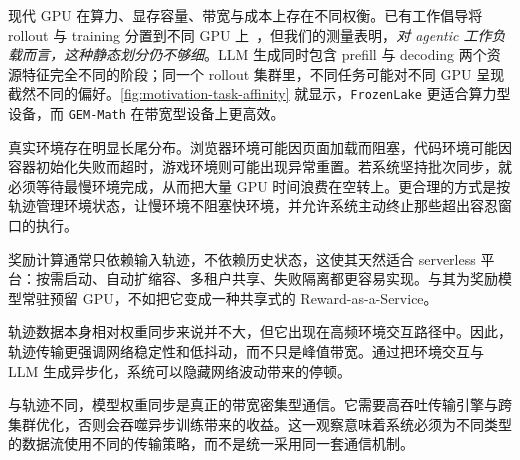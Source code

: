 现代 GPU 在算力、显存容量、带宽与成本上存在不同权衡。已有工作倡导将 rollout 与 training 分置到不同 GPU 上~\cite{StreamRL,asyncflow,seamlessflow}，但我们的测量表明，\emph{对 agentic 工作负载而言，这种静态划分仍不够细}。LLM 生成同时包含 prefill 与 decoding 两个资源特征完全不同的阶段；同一个 rollout 集群里，不同任务可能对不同 GPU 呈现截然不同的偏好。\autoref{fig:motivation-task-affinity} 就显示，\texttt{FrozenLake} 更适合算力型设备，而 \texttt{GEM-Math} 在带宽型设备上更高效。

真实环境存在明显长尾分布。浏览器环境可能因页面加载而阻塞，代码环境可能因容器初始化失败而超时，游戏环境则可能出现异常重置。若系统坚持批次同步，就必须等待最慢环境完成，从而把大量 GPU 时间浪费在空转上。更合理的方式是按轨迹管理环境状态，让慢环境不阻塞快环境，并允许系统主动终止那些超出容忍窗口的执行。

奖励计算通常只依赖输入轨迹，不依赖历史状态，这使其天然适合 serverless 平台：按需启动、自动扩缩容、多租户共享、失败隔离都更容易实现。与其为奖励模型常驻预留 GPU，不如把它变成一种共享式的 Reward-as-a-Service。

轨迹数据本身相对权重同步来说并不大，但它出现在高频环境交互路径中。因此，轨迹传输更强调网络稳定性和低抖动，而不只是峰值带宽。通过把环境交互与 LLM 生成异步化，系统可以隐藏网络波动带来的停顿。

与轨迹不同，模型权重同步是真正的带宽密集型通信。它需要高吞吐传输引擎与跨集群优化，否则会吞噬异步训练带来的收益。这一观察意味着系统必须为不同类型的数据流使用不同的传输策略，而不是统一采用同一套通信机制。
